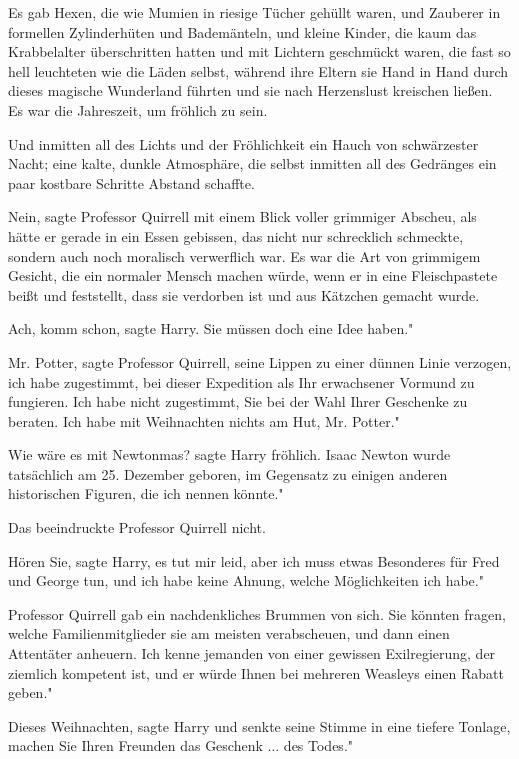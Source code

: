 Es gab Hexen, die wie Mumien in riesige Tücher gehüllt waren, und Zauberer in
formellen Zylinderhüten und Bademänteln, und kleine Kinder, die kaum das
Krabbelalter überschritten hatten und mit Lichtern geschmückt waren, die fast so
hell leuchteten wie die Läden selbst, während ihre Eltern sie Hand in Hand durch
dieses magische Wunderland führten und sie nach Herzenslust kreischen ließen. Es
war die Jahreszeit, um fröhlich zu sein.

Und inmitten all des Lichts und der Fröhlichkeit ein Hauch von schwärzester
Nacht; eine kalte, dunkle Atmosphäre, die selbst inmitten all des Gedränges ein
paar kostbare Schritte Abstand schaffte.

\glqq{}Nein\grqq{}, sagte Professor Quirrell mit einem Blick voller grimmiger
Abscheu, als hätte er gerade in ein Essen gebissen, das nicht nur schrecklich
schmeckte, sondern auch noch moralisch verwerflich war. Es war die Art von
grimmigem Gesicht, die ein normaler Mensch machen würde, wenn er in eine
Fleischpastete beißt und feststellt, dass sie verdorben ist und aus Kätzchen
gemacht wurde.

\glqq{}Ach, komm schon\grqq{}, sagte Harry. \glqq{}Sie müssen doch eine Idee
haben."

\glqq{}Mr. Potter\grqq{}, sagte Professor Quirrell, seine Lippen zu einer dünnen
Linie verzogen, \glqq{}ich habe zugestimmt, bei dieser Expedition als Ihr
erwachsener Vormund zu fungieren. Ich habe nicht zugestimmt, Sie bei der Wahl
Ihrer Geschenke zu beraten. Ich habe mit Weihnachten nichts am Hut, Mr. Potter."

\glqq{}Wie wäre es mit Newtonmas?\grqq{} sagte Harry fröhlich. \glqq{}Isaac Newton
wurde tatsächlich am 25. Dezember geboren, im Gegensatz zu einigen anderen
historischen Figuren, die ich nennen könnte."

Das beeindruckte Professor Quirrell nicht.

\glqq{}Hören Sie\grqq{}, sagte Harry, \glqq{}es tut mir leid, aber ich muss etwas
Besonderes für Fred und George tun, und ich habe keine Ahnung, welche
Möglichkeiten ich habe."

Professor Quirrell gab ein nachdenkliches Brummen von sich. \glqq{}Sie könnten
fragen, welche Familienmitglieder sie am meisten verabscheuen, und dann einen
Attentäter anheuern. Ich kenne jemanden von einer gewissen Exilregierung, der
ziemlich kompetent ist, und er würde Ihnen bei mehreren Weasleys einen Rabatt
geben."

\glqq{}Dieses Weihnachten\grqq{}, sagte Harry und senkte seine Stimme in eine
tiefere Tonlage, \glqq{}machen Sie Ihren Freunden das Geschenk ... des Todes."

